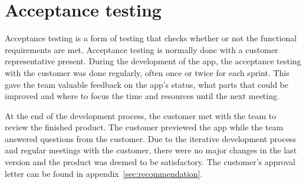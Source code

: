 \newpage
\section{Acceptance testing}
\label{sec:acceptance}
Acceptance testing is a form of testing that checks whether or not the functional requirements are met. Acceptance testing is normally done with a customer representative present. During the development of the app, the acceptance testing with the customer was done regularly, often once or twice for each sprint. This gave the team valuable feedback on the app's status, what parts that could be improved and where to focus the time and resources until the next meeting.

At the end of the development process, the customer met with the team to review the finished product. The customer previewed the app while the team answered questions from the customer. Due to the iterative development process and regular meetings with the customer, there were no major changes in the last version and the product was deemed to be satisfactory. The customer's approval letter can be found in appendix~\ref{sec:recommendation}.